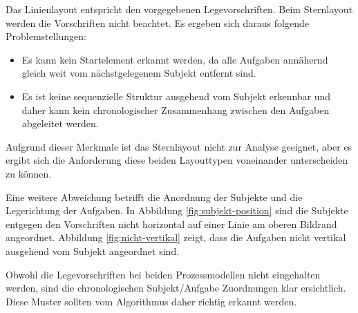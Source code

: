 Das Linienlayout entspricht den vorgegebenen Legevorschriften. Beim Sternlayout werden die Vorschriften nicht beachtet. Es ergeben sich daraus folgende Problemstellungen:
\begin{itemize}
	\item Es kann kein Startelement erkannt werden, da alle Aufgaben annähernd gleich weit vom nächstgelegenem Subjekt entfernt sind.
	\item Es ist keine sequenzielle Struktur ausgehend vom Subjekt erkennbar und daher kann kein chronologischer Zusammenhang zwischen den Aufgaben abgeleitet werden.
\end{itemize}

Aufgrund dieser Merkmale ist das Sternlayout nicht zur Analyse geeignet, aber es ergibt sich die Anforderung diese beiden Layouttypen voneinander unterscheiden zu können.

Eine weitere Abweichung betrifft die Anordnung der Subjekte und die Legerichtung der Aufgaben. In Abbildung \ref{fig:subjekt-position} sind die Subjekte entgegen den Vorschriften nicht horizontal auf einer Linie am oberen Bildrand angeordnet. Abbildung \ref{fig:nicht-vertikal} zeigt, dass die Aufgaben nicht vertikal ausgehend vom Subjekt angeordnet sind.

Obwohl die Legevorschriften bei beiden Prozessmodellen nicht eingehalten werden, sind die chronologischen Subjekt/Aufgabe Zuordnungen klar ersichtlich. Diese Muster sollten vom Algorithmus daher richtig erkannt werden. 

